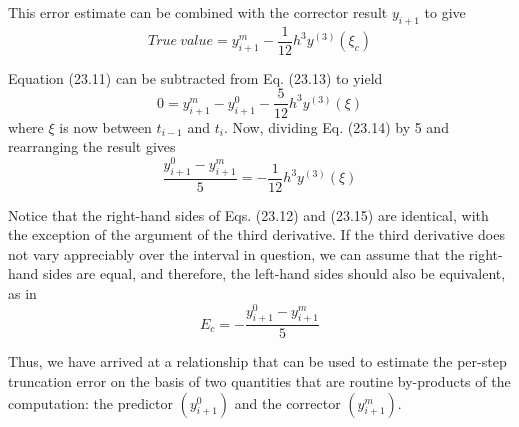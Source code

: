 \documentclass[../main.tex]{subfiles}
\begin{document}
\noindent This error estimate can be combined with the corrector result $y_{i+1}$ to give
\begin{equation}
    \tag{23.13}
    True\ value =y_{i+1}^{m}-\frac{1}{12} h^{3} y^{(3)}\left(\xi_{c}\right)
\end{equation}

\noindent Equation (23.11) can be subtracted from Eq. (23.13) to yield
\begin{equation}
    \tag{23.14}
    0=y_{i+1}^{m}-y_{i+1}^{0}-\frac{5}{12} h^{3} y^{(3)}(\xi)
\end{equation}
where $\xi$ is now between $t_{i-1}$ and $t_{i}$. Now, dividing Eq. (23.14) by 5 and rearranging the result gives
\begin{equation}
    \tag{23.15}
    \frac{y_{i+1}^{0}-y_{i+1}^{m}}{5}=-\frac{1}{12} h^{3} y^{(3)}(\xi)
\end{equation}

\noindent Notice that the right-hand sides of Eqs. (23.12) and (23.15) are identical, with the exception of the argument of the third derivative. If the third derivative does not vary appreciably over the interval in question, we can assume that the right-hand sides are equal, and therefore, the left-hand sides should also be equivalent, as in
\begin{equation}
    \tag{23.16}
    E_{c}=-\frac{y_{i+1}^{0}-y_{i+1}^{m}}{5}
\end{equation}

\noindent Thus, we have arrived at a relationship that can be used to estimate the per-step truncation error on the basis of two quantities that are routine by-products of the computation: the predictor $\left(y_{i+1}^{0}\right)$ and the corrector $\left(y_{i+1}^{m}\right)$.
\end{document}
